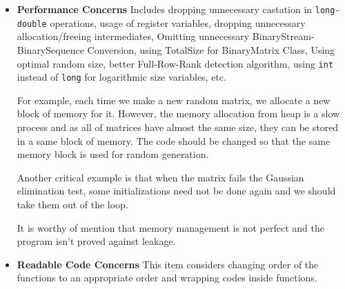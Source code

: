\begin{itemize}
	   \item {\bf Performance Concerns} Includes dropping unnecessary castation in \texttt{long-double} operations, usage of register variables, dropping unnecessary allocation/freeing intermediates, Omitting unnecessary BinaryStream-BinarySequence Conversion, using TotalSize for BinaryMatrix Class, Using optimal random size, better Full-Row-Rank detection algorithm, using \texttt{int} instead of \texttt{long} for logarithmic size variables, etc. 

	   For example, each time we make a new random matrix, we allocate a new block of memory for it. However, the memory allocation from heap is a slow process and as all of matrices have almost the same size, they can be stored in a same block of memory. The code should be changed so that the same memory block is used for random generation.

	   Another critical example is that when the matrix fails the Gaussian elimination test, some initializations need not be done again and we should take them out of the loop.

	   It is worthy of mention that memory management is not perfect and the program isn't proved against leakage.

	   \item {\bf Readable Code Concerns} This item considers changing order of the
	     functions to an appropriate order and wrapping codes inside functions.

\end{itemize}
